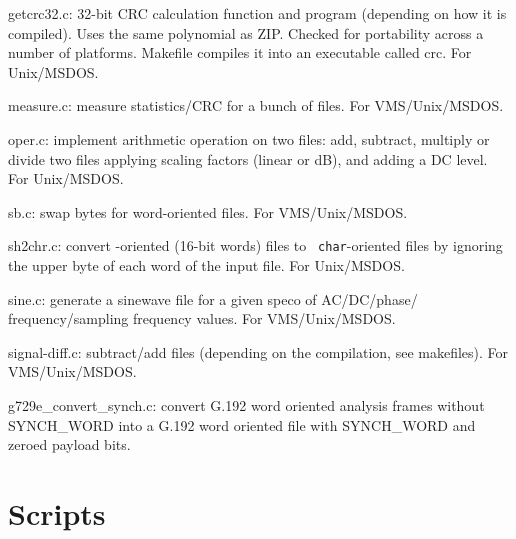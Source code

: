 \begin{Descr}{40mm}
\item[getcrc32.c:]
         32-bit CRC calculation function and program (depending on
         how it is compiled). Uses the same polynomial as
         ZIP. Checked for portability across a number of
         platforms. Makefile compiles it into an executable called
         crc. For Unix/MSDOS.

\item[measure.c:]
        measure statistics/CRC for a bunch of files.  For
        VMS/Unix/MSDOS.

\item[oper.c:]
            implement arithmetic operation on two files: add,
            subtract, multiply or divide two files applying
            scaling factors (linear or dB), and adding a DC
            level. For Unix/MSDOS.

\item[sb.c:]
        swap bytes for word-oriented files. For
        VMS/Unix/MSDOS.

\item[sh2chr.c:]
           convert \short-oriented (16-bit words) files to {\tt
           char}-oriented files by ignoring the upper byte of each
           word of the input file. For Unix/MSDOS.

\item[sine.c:]
        generate a sinewave file for a given speco of
        AC/DC/phase/ frequency/sampling frequency values. For
        VMS/Unix/MSDOS.

\item[signal-diff.c:]
        subtract/add files (depending on the compilation, see
        makefiles). For VMS/Unix/MSDOS.


\item[g729e\_convert\_synch.c:]
        convert G.192 word oriented analysis 
        frames without SYNCH\_WORD into a G.192 word oriented 
        file with SYNCH\_WORD and zeroed payload bits. 
         
\end{Descr}


\section{Scripts}

